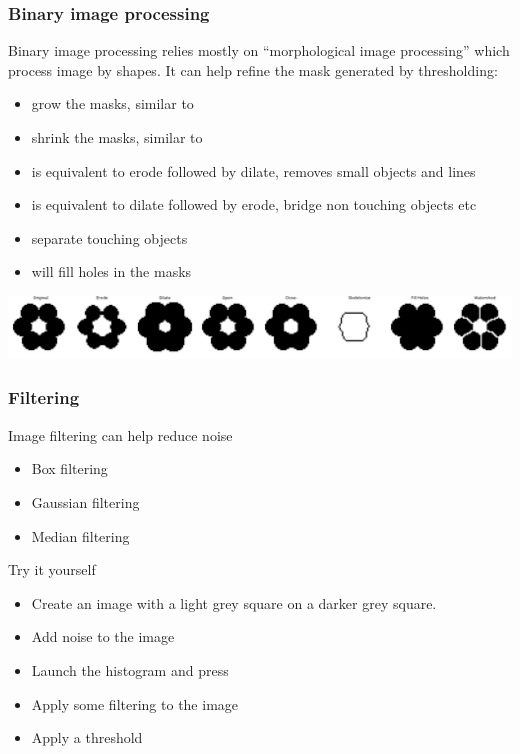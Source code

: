 \documentclass[ignorenonframetext,aspectratio=169,10pt,xcolor=table]{beamer}
\begin{document}
\begin{frame} \frametitle{Binary image processing} Binary image
  processing relies mostly on ``morphological image processing'' which
  process image by shapes. It can help refine the mask generated by
  thresholding:
  \begin{itemize}
  \item {} grow the masks, similar to
  \item {} shrink the masks, similar to
  \item {} is equivalent to erode followed by
    dilate, removes small objects and lines
  \item {} is equivalent to dilate followed
    by erode, bridge non touching objects etc
  \item {} separate touching objects
  \item {} will fill holes in the masks
  \end{itemize}
  \begin{center} \includegraphics[width=\textwidth]{flower}
  \end{center}
\end{frame}

\begin{frame} \frametitle{Filtering} Image filtering can help reduce
  noise
  \begin{itemize}
  \item Box filtering 
  \item Gaussian filtering 
  \item Median filtering 
  \end{itemize}

  \begin{block}{Try it yourself}
    \begin{itemize}
    \item Create an image with a light grey square on a darker grey
      square.
    \item Add noise to the image
    \item Launch the histogram and press 
    \item Apply some filtering to the image
    \item Apply a threshold
    \end{itemize}
  \end{block}
\end{frame}
\end{document}
